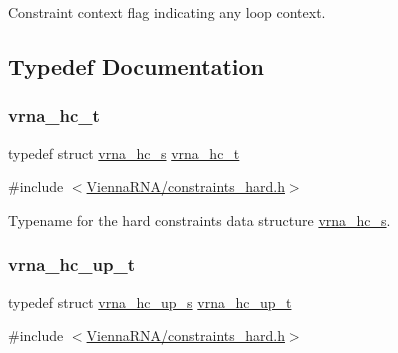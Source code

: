 Constraint context flag indicating any loop context. 



\subsection{Typedef Documentation}
\mbox{\label{group__hard__constraints_gac7e4c4f8abe3163a68110c5bff24e01d}} 
\subsubsection{\texorpdfstring{vrna\+\_\+hc\+\_\+t}{vrna\_hc\_t}}
{\footnotesize\ttfamily typedef struct \mbox{\hyperlink{group__hard__constraints_structvrna__hc__s}{vrna\+\_\+hc\+\_\+s}} \mbox{\hyperlink{group__hard__constraints_gac7e4c4f8abe3163a68110c5bff24e01d}{vrna\+\_\+hc\+\_\+t}}}



{\ttfamily \#include $<$\mbox{\hyperlink{constraints__hard_8h}{Vienna\+R\+N\+A/constraints\+\_\+hard.\+h}}$>$}



Typename for the hard constraints data structure \mbox{\hyperlink{group__hard__constraints_structvrna__hc__s}{vrna\+\_\+hc\+\_\+s}}. 

\mbox{\label{group__hard__constraints_ga8cd53427a942a81c87ec526bbff32ef9}} 
\subsubsection{\texorpdfstring{vrna\+\_\+hc\+\_\+up\+\_\+t}{vrna\_hc\_up\_t}}
{\footnotesize\ttfamily typedef struct \mbox{\hyperlink{group__hard__constraints_structvrna__hc__up__s}{vrna\+\_\+hc\+\_\+up\+\_\+s}} \mbox{\hyperlink{group__hard__constraints_ga8cd53427a942a81c87ec526bbff32ef9}{vrna\+\_\+hc\+\_\+up\+\_\+t}}}



{\ttfamily \#include $<$\mbox{\hyperlink{constraints__hard_8h}{Vienna\+R\+N\+A/constraints\+\_\+hard.\+h}}$>$}




